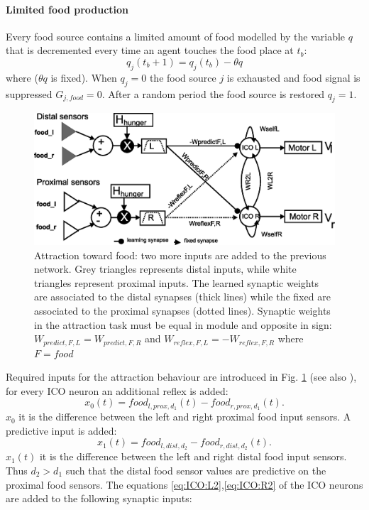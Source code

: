 \paragraph{Limited food production}
Every food source contains a limited amount of food modelled by the variable $q$ that
 is decremented every time an agent touches the food place at $t_{b}$:
\begin{equation}
q_{j}(t_{b}+1)=q_{j}(t_{b})-\theta q
\label{eq:qfood}
\end{equation}
where ($\theta q$ is fixed).
When $q_{j}=0$ the food source $j$ is exhausted and food signal is suppressed $G_{j,food}=0$.
After a random period the food source is restored $q_{j}=1$.
\begin{figure}[htb]
\includegraphics[scale=0.4]{figures/socialadapt/attractionFood.eps}
\vspace*{4pt}
\small{
\caption[Attraction learning behaviour for food]{Attraction toward food:
two more inputs are added to the previous network. Grey triangles represents
distal inputs, while white triangles represent proximal inputs.
The learned synaptic weights are associated to the distal synapses (thick lines)
 while the fixed are associated to the proximal synapses (dotted lines).
Synaptic weights in the attraction task must be equal in module and opposite
in sign: $W_{predict,F,L}=W_{predict,F,R}$ and $W_{reflex,F,L}=-W_{reflex,F,R}$
where $F=food$ \label{fig:attraction}}
}
\end{figure}

Required inputs for the attraction behaviour are introduced in
Fig. \ref{fig:attraction} (see also \citep{Stamm2006}),
for every ICO neuron an additional reflex is added:
\begin{equation}
x_{0}(t)=food_{l,prox,d_{1}}(t)-food_{r,prox,d_{1}}(t).
\end{equation}
$x_{0}$ it is the difference between the left and right proximal food input sensors.
A predictive input is added:
\begin{equation}
x_{1}(t)=food_{l,dist,d_{2}}-food_{r,dist,d_{2}}(t).
\end{equation}
$x_{1}(t)$ it is the difference between the left and right distal food input sensors.
Thus $d_{2}>d_{1}$ such that the distal food sensor values are
predictive on the proximal food sensors.
The equations \ref{eq:ICO:L2},\ref{eq:ICO:R2} of the ICO neurons are added to the
following synaptic inputs:

